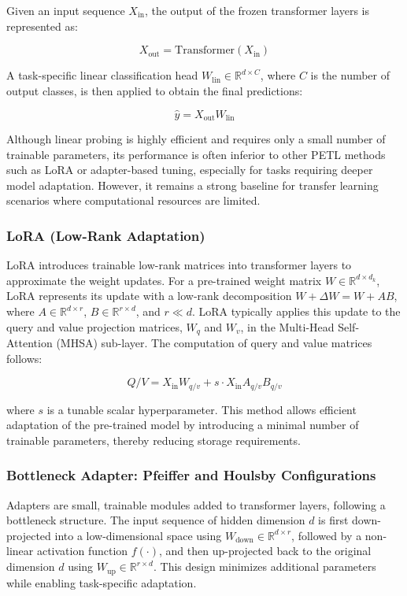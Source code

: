 \documentclass[11pt]{article}
\begin{document}
Given an input sequence $X_{\text{in}}$, the output of the frozen transformer layers is represented as:

\begin{equation}
X_{\text{out}} = \text{Transformer}(X_{\text{in}})
\end{equation}

A task-specific linear classification head $W_{\text{lin}} \in \mathbb{R}^{d \times C}$, where $C$ is the number of output classes, is then applied to obtain the final predictions:

\begin{equation}
\hat{y} = X_{\text{out}} W_{\text{lin}}
\end{equation}

Although linear probing is highly efficient and requires only a small number of trainable parameters, its performance is often inferior to other PETL methods such as LoRA or adapter-based tuning, especially for tasks requiring deeper model adaptation. However, it remains a strong baseline for transfer learning scenarios where computational resources are limited.

\subsubsection{LoRA (Low-Rank Adaptation)}
LoRA introduces trainable low-rank matrices into transformer layers to approximate the weight updates. For a pre-trained weight matrix $W \in \mathbb{R}^{d \times d_k}$, LoRA represents its update with a low-rank decomposition $W + \Delta W = W + AB$, where $A \in \mathbb{R}^{d \times r}$, $B \in \mathbb{R}^{r \times d}$, and $r \ll d$. LoRA typically applies this update to the query and value projection matrices, $W_q$ and $W_v$, in the Multi-Head Self-Attention (MHSA) sub-layer. The computation of query and value matrices follows:

\begin{equation}
Q/V = X_{\text{in}} W_{q/v} + s \cdot X_{\text{in}} A_{q/v} B_{q/v}
\end{equation}

where $s$ is a tunable scalar hyperparameter. This method allows efficient adaptation of the pre-trained model by introducing a minimal number of trainable parameters, thereby reducing storage requirements.

\subsubsection{Bottleneck Adapter: Pfeiffer and Houlsby Configurations}
Adapters are small, trainable modules added to transformer layers, following a bottleneck structure. The input sequence of hidden dimension $d$ is first down-projected into a low-dimensional space using $W_{\text{down}} \in \mathbb{R}^{d \times r}$, followed by a non-linear activation function $f(\cdot)$, and then up-projected back to the original dimension $d$ using $W_{\text{up}} \in \mathbb{R}^{r \times d}$. This design minimizes additional parameters while enabling task-specific adaptation.
\end{document}
